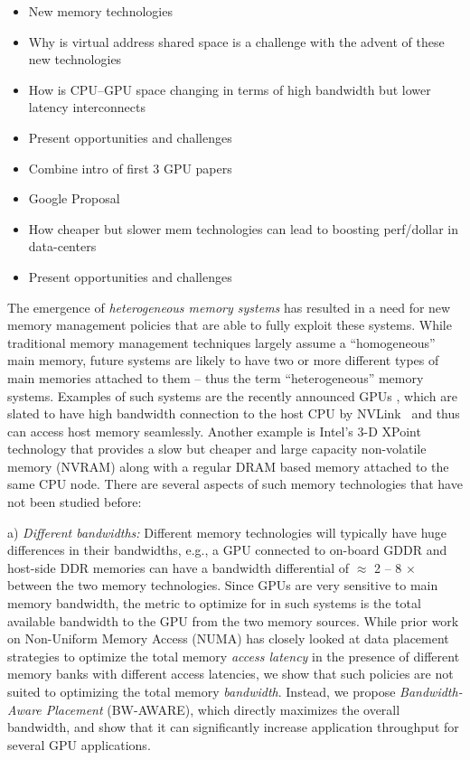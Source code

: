 
{\color{red}
\begin{itemize}
\item New memory technologies
\item Why is virtual address shared space is a challenge with the advent of
these new technologies

\item How is CPU--GPU space changing in terms
of high bandwidth but lower latency interconnects
\item Present opportunities and challenges
\item Combine intro of first 3 GPU papers

\item Google Proposal
\item How cheaper but slower mem technologies can lead to boosting perf/dollar
in data-centers
\item Present opportunities and challenges
\end{itemize}
}

The emergence of {\it heterogeneous memory systems} has resulted in a need for
new memory management policies that are able to fully exploit these systems.
While traditional memory management techniques largely assume a ``homogeneous''
main memory, future systems are likely to have two or more different types of
main memories attached to them -- thus the term ``heterogeneous'' memory
systems. Examples of such systems are the recently announced GPUs
 \cite{pascal}, which are slated to have high bandwidth connection to the host
CPU by NVLink~\cite{NVLINK} and thus can access host memory seamlessly.  Another
example is Intel's 3-D XPoint~\cite{xpoint} technology that provides a slow but
cheaper and large capacity non-volatile memory (NVRAM) along with a regular DRAM
based memory attached to the same CPU node.  There are several aspects of such
memory technologies that have not been studied before:

a) {\it Different bandwidths:} Different memory technologies will typically have
huge differences in their bandwidths, e.g., a GPU connected to on-board GDDR and
host-side DDR memories can have a bandwidth differential of $\approx$ 2 -- 8
$\times$ between the two memory technologies. Since GPUs are very sensitive to
main memory bandwidth, the metric to optimize for in such systems is the total
available bandwidth to the GPU from the two memory sources. While prior
work on Non-Uniform Memory Access (NUMA) has closely looked at data placement
strategies to optimize the total memory {\it access latency} in the presence of
different memory banks with different access latencies, we show that such
policies are not suited to optimizing the total memory {\it bandwidth}. Instead,
we propose {\it Bandwidth-Aware Placement} (BW-AWARE), which directly maximizes
the overall bandwidth, and show that it can significantly increase application
throughput for several GPU applications.

